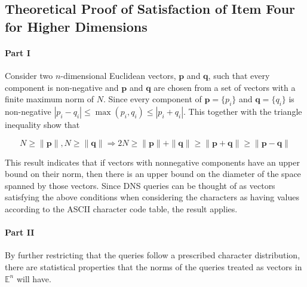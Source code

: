 \documentclass[12pt]{report}
\theoremstyle{remark}
\theoremstyle{definition}
\theoremstyle{definition}
\theoremstyle{definition}
\begin{document}

\subsection{Theoretical Proof of Satisfaction of Item Four for Higher Dimensions}
\label{item-four-theory}

\paragraph{Part I} Consider two $n$-dimensional Euclidean vectors, $\mathbf p$ and $\mathbf q$,
such that every component is non-negative and $\mathbf p$ and $\mathbf q$ are
chosen from a set of vectors with a finite maximum norm of $N$. Since every
component of $\mathbf p=\{p_i\}$ and $\mathbf q=\{q_i\}$ is non-negative
$|p_i-q_i|\leq\max{(p_i,q_i)}\leq|p_i+q_i|$. This together with the triangle
inequality show that

\begin{equation}
N\geq\|\mathbf p\|,N\geq\|\mathbf q\|\Rightarrow 2N\geq\|\mathbf p\|+\|\mathbf
q\|\geq\|\mathbf p+\mathbf q\|\geq\|\mathbf p-\mathbf q\|
\end{equation}

This result indicates that if vectors with nonnegative components have an upper
bound on their norm, then there is an upper bound on the diameter of the space
spanned by those vectors. Since DNS queries can be thought of as vectors
satisfying the above conditions when considering the characters as having values
according to the ASCII character code table\cite{asciitable}, the result
applies.

\paragraph{Part II} By further restricting that the queries follow a prescribed
character distribution, there are statistical properties that the norms of the
queries treated as vectors in $\mathbb E^n$ will have.
\end{document}
